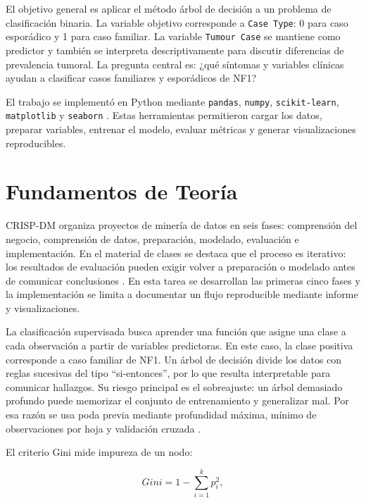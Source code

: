 \documentclass[10pt,a4paper]{article}
\begin{document}
El objetivo general es aplicar el método árbol de decisión a un problema de clasificación binaria. La variable objetivo corresponde a \texttt{Case Type}: 0 para caso esporádico y 1 para caso familiar. La variable \texttt{Tumour Case} se mantiene como predictor y también se interpreta descriptivamente para discutir diferencias de prevalencia tumoral. La pregunta central es: ¿qué síntomas y variables clínicas ayudan a clasificar casos familiares y esporádicos de NF1?

El trabajo se implementó en Python mediante \texttt{pandas}, \texttt{numpy}, \texttt{scikit-learn}, \texttt{matplotlib} y \texttt{seaborn} \citep{pandas2020,sklearn2011,hunter2007,waskom2021}. Estas herramientas permitieron cargar los datos, preparar variables, entrenar el modelo, evaluar métricas y generar visualizaciones reproducibles.

\section{Fundamentos de Teoría}

CRISP-DM organiza proyectos de minería de datos en seis fases: comprensión del negocio, comprensión de datos, preparación, modelado, evaluación e implementación. En el material de clases se destaca que el proceso es iterativo: los resultados de evaluación pueden exigir volver a preparación o modelado antes de comunicar conclusiones \citep{chapman2000,levano2026}. En esta tarea se desarrollan las primeras cinco fases y la implementación se limita a documentar un flujo reproducible mediante informe y visualizaciones.

La clasificación supervisada busca aprender una función que asigne una clase a cada observación a partir de variables predictoras. En este caso, la clase positiva corresponde a caso familiar de NF1. Un árbol de decisión divide los datos con reglas sucesivas del tipo ``si-entonces'', por lo que resulta interpretable para comunicar hallazgos. Su riesgo principal es el sobreajuste: un árbol demasiado profundo puede memorizar el conjunto de entrenamiento y generalizar mal. Por esa razón se usa poda previa mediante profundidad máxima, mínimo de observaciones por hoja y validación cruzada \citep{breiman1984,sklearn2011}.

El criterio Gini mide impureza de un nodo:

\begin{equation}
Gini = 1 - \sum_{i=1}^{k} p_i^2,
\end{equation}
\end{document}
